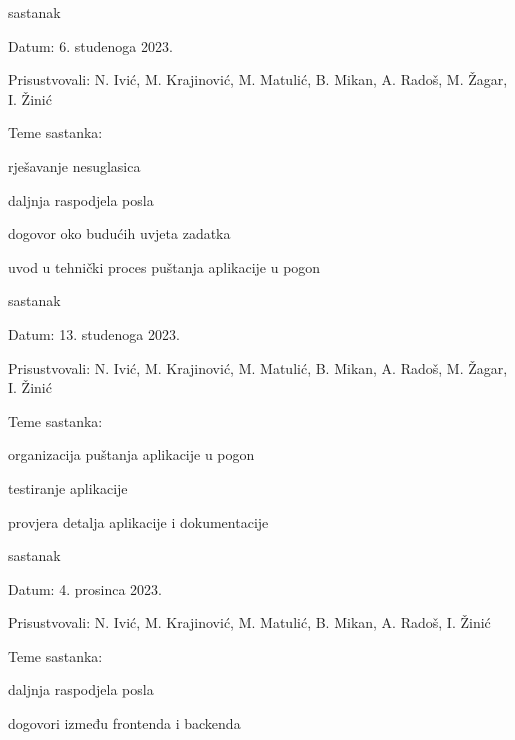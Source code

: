 \begin{packed_enum}
			\item  sastanak
			\item[] \begin{packed_item}
				\item Datum: 6. studenoga 2023.
				\item Prisustvovali: N. Ivić, M. Krajinović, M. Matulić, B. Mikan, A. Radoš, M. Žagar, I. Žinić
				\item Teme sastanka:
				\begin{packed_item}
					\item  rješavanje nesuglasica
					\item  daljnja raspodjela posla
					\item  dogovor oko budućih uvjeta zadatka
					\item  uvod u tehnički proces puštanja aplikacije u pogon
				\end{packed_item}
			\end{packed_item}
			
			\item  sastanak
			\item[] \begin{packed_item}
				\item Datum: 13. studenoga 2023.
				\item Prisustvovali: N. Ivić, M. Krajinović, M. Matulić, B. Mikan, A. Radoš, M. Žagar, I. Žinić
				\item Teme sastanka:
				\begin{packed_item}
					\item  organizacija puštanja aplikacije u pogon
					\item  testiranje aplikacije
					\item  provjera detalja aplikacije i dokumentacije
				\end{packed_item}
			\end{packed_item}
			
			\item  sastanak
			\item[] \begin{packed_item}
				\item Datum: 4. prosinca 2023.
				\item Prisustvovali: N. Ivić, M. Krajinović, M. Matulić, B. Mikan, A. Radoš, I. Žinić
				\item Teme sastanka:
				\begin{packed_item}
					\item  daljnja raspodjela posla
					\item  dogovori između frontenda i backenda
				\end{packed_item}
			\end{packed_item}
			

\end{packed_enum}
